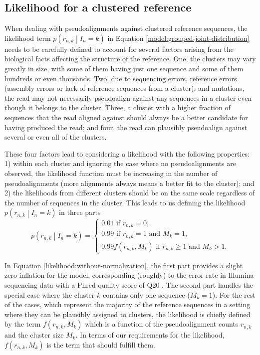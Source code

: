 \documentclass[officiallayout]{tktla}
\begin{document}
\subsection{Likelihood for a clustered reference}

When dealing with pseudoalignments against clustered reference
sequences, the likelihood term $p\left(r_{n, k} \middle| I_{n} =
k\right)$ in Equation \ref{model:grouped-joint-distribution} needs to
be carefully defined to account for several factors arising from the
biological facts affecting the structure of the reference. One, the
clusters may vary greatly in size, with some of them having just one
sequence and some of them hundreds or even thousands. Two, due to
sequencing errors, reference errors (assembly errors or lack of
reference sequences from a cluster), and mutations, the read may not
necessarily pseudoalign against any sequences in a cluster even though
it belongs to the cluster. Three, a cluster with a higher fraction of
sequences that the read aligned against should always be a better
candidate for having produced the read; and four, the read can
plausibly pseudoalign against several or even all of the clusters.

These four factors lead to considering a likelihood with the following
properties: 1) within each cluster and ignoring the case where no
pseudoalignments are observed, the likelihood function must be
increasing in the number of pseudoalignments (more alignments always
means a better fit to the cluster); and 2) the likelihoods from different
clusters should be on the same scale regardless of the number of
sequences in the cluster. This leads to us
defining the likelihood $p\left(r_{n, k} \middle| I_{n} = k\right)$ in
three parts
\begin{equation}
  \label{likelihood:without-normalization}
  p\left(r_{n, k} \middle| I_{n} = k\right) =
  \begin{cases}
    0.01\text{ if } r_{n, k} = 0, \\
    0.99\text{ if } r_{n, k} = 1 \text{ and } M_{k} = 1, \\
    0.99f\left(r_{n, k}, M_{k}\right)\text{ if } r_{n, k} \geq 1\text{ and } M_{k} > 1.
  \end{cases}
\end{equation}

In Equation \ref{likelihood:without-normalization}, the first part
provides a slight zero-inflation for the model, corresponding
(roughly) to the error rate in Illumina sequencing data with a Phred
quality score of Q20 \citep{ewing1998baseone, ewing1998basetwo}. The
second part handles the special case where the cluster $k$ contains
only one sequence ($M_{k} = 1$). For the rest of the cases, which
represent the majority of the reference sequences in a setting where
they can be plausibly assigned to clusters, the likelihood is chiefly
defined by the term $f\left(r_{n, k}, M_{k}\right)$ which is a
function of the pseudoalignment counts $r_{n, k}$ and the cluster size
$M_{k}$. In terms of our requirements for the likelihood,
$f\left(r_{n, k}, M_{k}\right)$ is the term that should fulfill them.
\end{document}

